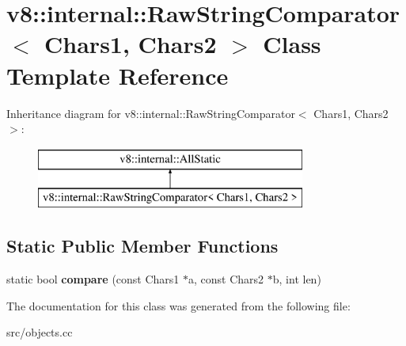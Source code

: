 \hypertarget{classv8_1_1internal_1_1_raw_string_comparator}{}\section{v8\+:\+:internal\+:\+:Raw\+String\+Comparator$<$ Chars1, Chars2 $>$ Class Template Reference}
\label{classv8_1_1internal_1_1_raw_string_comparator}
Inheritance diagram for v8\+:\+:internal\+:\+:Raw\+String\+Comparator$<$ Chars1, Chars2 $>$\+:\begin{figure}[H]
\begin{center}
\leavevmode
\includegraphics[height=2.000000cm]{classv8_1_1internal_1_1_raw_string_comparator}
\end{center}
\end{figure}
\subsection*{Static Public Member Functions}
\begin{DoxyCompactItemize}
\item 
\hypertarget{classv8_1_1internal_1_1_raw_string_comparator_ae347b3b0e50985f71e1cba006255acf2}{}static bool {\bfseries compare} (const Chars1 $\ast$a, const Chars2 $\ast$b, int len)\label{classv8_1_1internal_1_1_raw_string_comparator_ae347b3b0e50985f71e1cba006255acf2}

\end{DoxyCompactItemize}


The documentation for this class was generated from the following file\+:\begin{DoxyCompactItemize}
\item 
src/objects.\+cc\end{DoxyCompactItemize}
